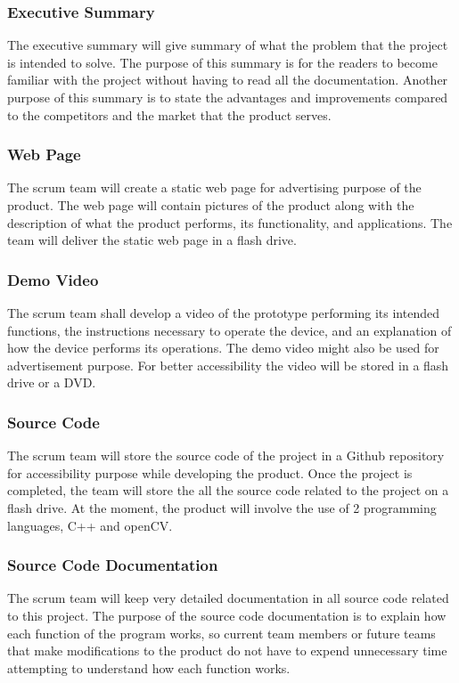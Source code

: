 \subsubsection{Executive Summary}
The executive summary will give summary of what the problem that the project is intended to solve. The purpose of this summary is for the readers to become familiar with the project without having to read all the documentation. Another purpose of this summary is to state the advantages and improvements compared to the competitors and the market that the product serves.

\subsubsection{Web Page}
The scrum team will create a static web page for advertising purpose of the product. The web page will contain pictures of the product along with the description of what the product performs, its functionality, and applications. The team will deliver the static web page in a flash drive.

\subsubsection{Demo Video}
The scrum team shall develop a video of the prototype performing its intended functions, the instructions necessary to operate the device, and an explanation of how the device performs its operations. The demo video might also be used for advertisement purpose. For better accessibility the video will be stored in a flash drive or a DVD.

\subsubsection{Source Code}
The scrum team will store the source code of the project in a Github repository for accessibility purpose while developing the product. Once the project is completed, the team will store the all the source code related to the project on a flash drive. At the moment, the product will involve the use of 2 programming languages, C++ and openCV.

\subsubsection{Source Code Documentation}
The scrum team will keep very detailed documentation in all source code related to this project. The purpose of the source code documentation is to explain how each function of the program works, so current team members or future teams that make modifications to the product do not have to expend unnecessary time attempting to understand how each function works.

